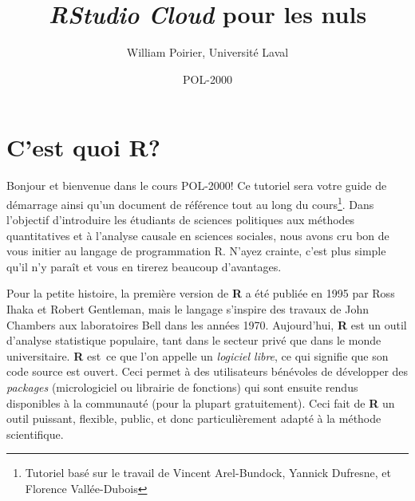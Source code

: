 \documentclass[10.5pt,a4paper]{article}
\title{\textbf{\emph{RStudio Cloud}} pour les nuls}
\author{William Poirier, Université Laval}
\date{POL-2000}
\begin{document}
 

\restoregeometry %
\nopagecolor%

\tableofcontents

\pagebreak

\section{C'est quoi R?}
Bonjour et bienvenue dans le cours POL-2000! Ce tutoriel sera votre guide de démarrage ainsi qu'un document de référence tout au long du cours\footnote{Tutoriel basé sur le travail de Vincent Arel-Bundock, Yannick Dufresne, et Florence Vallée-Dubois}. Dans l'objectif d'introduire les étudiants de sciences politiques aux méthodes quantitatives et à l'analyse causale en sciences sociales, nous avons cru bon de vous initier au langage de programmation R. N'ayez crainte, c'est plus simple qu'il n'y paraît et vous en tirerez beaucoup d'avantages. 

Pour la petite histoire, la première version de \textbf{R} a été publiée en 1995 par Ross Ihaka et Robert Gentleman, mais le langage s'inspire des travaux de John Chambers aux laboratoires Bell dans les années 1970. Aujourd'hui, \textbf{R} est un outil d'analyse statistique populaire, tant dans le secteur privé que dans le monde universitaire. \textbf{R} est\ ce que l'on appelle un \textit{logiciel libre}, ce qui signifie que son code source est ouvert. Ceci permet à des utilisateurs bénévoles de développer des \textit{packages} (micrologiciel ou librairie de fonctions) qui sont ensuite rendus disponibles à la communauté (pour la plupart gratuitement). Ceci fait de \textbf{R} un outil puissant, flexible, public, et donc particulièrement adapté à la méthode scientifique. 
\end{document}
